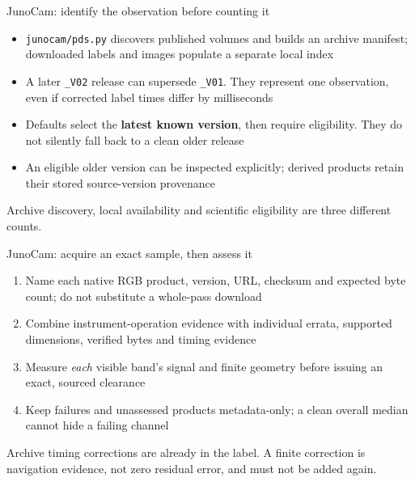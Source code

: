 \documentclass[aspectratio=169,11pt]{beamer}
\newcommand{\currevsec}{}
\newcommand{\revsec}[1]{\gdef\currevsec{#1}}
\begin{document}
\begin{frame}{JunoCam: identify the observation before counting it}
  \revsec{4.18}
\begin{itemize}
    \item \texttt{junocam/pds.py} discovers published volumes and builds an archive manifest; downloaded labels and images populate a separate local index
    \item A later \texttt{\_V02} release can supersede \texttt{\_V01}. They represent one observation, even if corrected label times differ by milliseconds
    \item Defaults select the \textbf{latest known version}, then require eligibility. They do not silently fall back to a clean older release
    \item An eligible older version can be inspected explicitly; derived products retain their stored source-version provenance
  \end{itemize}
  Archive discovery, local availability and scientific eligibility are three different counts.
\end{frame}

\begin{frame}{JunoCam: acquire an exact sample, then assess it}
  \revsec{4.18}
  \begin{enumerate}
    \item Name each native RGB product, version, URL, checksum and expected byte count; do not substitute a whole-pass download
    \item Combine instrument-operation evidence with individual errata, supported dimensions, verified bytes and timing evidence
    \item Measure \emph{each} visible band's signal and finite geometry before issuing an exact, sourced clearance
    \item Keep failures and unassessed products metadata-only; a clean overall median cannot hide a failing channel
  \end{enumerate}
  \vspace{0.2cm}
  Archive timing corrections are already in the label. A finite correction is navigation evidence, not zero residual error, and must not be added again.
\end{frame}
\end{document}
